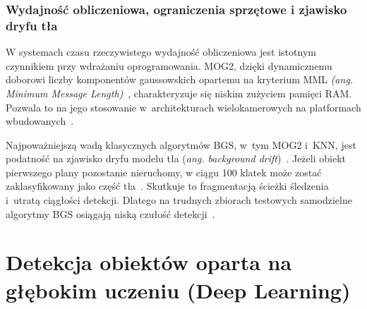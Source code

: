\subsubsection{Wydajność obliczeniowa, ograniczenia sprzętowe i zjawisko dryfu tła}

W systemach czasu rzeczywistego wydajność obliczeniowa jest istotnym czynnikiem przy wdrażaniu
oprogramowania\cite{bouwmans2014}. MOG2, dzięki dynamicznemu doborowi liczby komponentów
gaussowskich opartemu na kryterium MML \textit{(ang. Minimum Message Length)}~\cite{zivkovic2004},
charakteryzuje się niskim zużyciem pamięci RAM. Pozwala to na jego stosowanie w~architekturach
wielokamerowych na platformach wbudowanych~\cite{waghmare2026}.

Najpoważniejszą wadą klasycznych algorytmów BGS, w~tym MOG2 i~KNN, jest podatność na zjawisko dryfu
modelu tła (\textit{ang. background drift})~\cite{waghmare2026}. Jeżeli obiekt pierwszego plany
pozostanie nieruchomy, w ciągu 100 klatek może zostać zaklasyfikowany jako część
tła~\cite{waghmare2026}. Skutkuje to fragmentacją ścieżki śledzenia i~utratą ciągłości detekcji.
Dlatego na trudnych zbiorach testowych samodzielne algorytmy BGS osiągają niską czułość
detekcji~\cite{waghmare2026}.


\section{Detekcja obiektów oparta na głębokim uczeniu (Deep Learning)}


